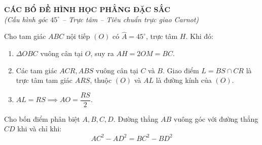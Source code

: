 \documentclass[12pt,a4paper]{article}
\begin{document}
\begin{center}
	{\Large \textbf{CÁC BỔ ĐỀ HÌNH HỌC PHẲNG ĐẶC SẮC}}\\[2mm]
	{\small \textit{(Cấu hình góc $45^\circ$ -- Trực tâm -- Tiêu chuẩn trực giao Carnot)}}
\end{center}
\vspace{4mm}

\begin{tcolorbox}[colback=blue!5!white,colframe=blue!75!black,title=\textbf{Bổ đề 1: Cấu hình Góc $45^\circ$, Trực tâm và Đường kính}]
Cho tam giác $ABC$ nội tiếp $(O)$ có $\widehat{A} = 45^\circ$, trực tâm $H$. Khi đó:
\begin{enumerate}
    \item $\Delta OBC$ vuông cân tại $O$, suy ra $AH = 2OM = BC$.
    \item Các tam giác $ACR, ABS$ vuông cân tại $C$ và $B$. Giao điểm $L = BS \cap CR$ là trực tâm tam giác $ARS$, thuộc $(O)$ và $AL$ là đường kính của $(O)$.
    \item $AL = RS \implies AO = \dfrac{RS}{2}$.
\end{enumerate}
\end{tcolorbox}

\vspace{3mm}

\begin{tcolorbox}[colback=teal!5!white,colframe=teal!75!black,title=\textbf{Bổ đề 2: Định lý Bốn điểm (Tiêu chuẩn Trực giao Carnot)}]
Cho bốn điểm phân biệt $A, B, C, D$. Đường thẳng $AB$ vuông góc với đường thẳng $CD$ khi và chỉ khi:
\[
AC^2 - AD^2 = BC^2 - BD^2
\]
\end{tcolorbox}
\end{document}
